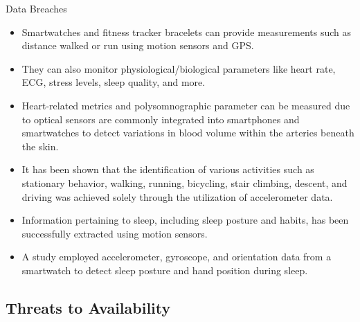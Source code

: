 \documentclass[ucs,9pt]{beamer}
\begin{document}
\begin{frame}{Data Breaches}
	\begin{itemize}
		
		\item Smartwatches and fitness tracker bracelets can provide measurements such as distance walked or run using motion sensors and GPS.
		\item  They can also monitor physiological/biological parameters like heart rate, ECG, stress levels, sleep quality, and more.
		
		\item Heart-related metrics and polysomnographic parameter can be measured due to optical sensors are commonly integrated into smartphones and smartwatches to detect variations in blood volume within the arteries beneath the skin.
		
		\item It has been shown that the identification of various activities such as stationary behavior, walking, running, bicycling, stair climbing, descent, and driving was achieved solely through the utilization of accelerometer data. 		
		\item Information pertaining to sleep, including sleep posture and habits, has been successfully extracted using motion sensors. 		
		\item A study employed accelerometer, gyroscope, and orientation data from a smartwatch to detect sleep posture and hand position during sleep.
	\end{itemize}
\end{frame}


\subsection{Threats to Availability}
\end{document}
